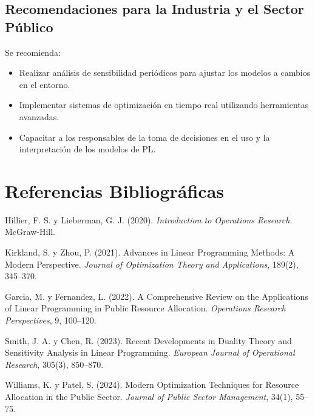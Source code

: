 	\subsection{Recomendaciones para la Industria y el Sector Público}
	Se recomienda:
	\begin{itemize}[noitemsep]
		\item Realizar análisis de sensibilidad periódicos para ajustar los modelos a cambios en el entorno.
		\item Implementar sistemas de optimización en tiempo real utilizando herramientas avanzadas.
		\item Capacitar a los responsables de la toma de decisiones en el uso y la interpretación de los modelos de PL.
	\end{itemize}
\section{Referencias Bibliográficas}

\begin{thebibliography}{10}
	
	Hillier, F. S. y Lieberman, G. J. (2020). \textit{Introduction to Operations Research}. McGraw-Hill.
	
	Kirkland, S. y Zhou, P. (2021). Advances in Linear Programming Methods: A Modern Perspective. \textit{Journal of Optimization Theory and Applications}, 189(2), 345--370.
	
	Garcia, M. y Fernandez, L. (2022). A Comprehensive Review on the Applications of Linear Programming in Public Resource Allocation. \textit{Operations Research Perspectives}, 9, 100--120.
	
	Smith, J. A. y Chen, R. (2023). Recent Developments in Duality Theory and Sensitivity Analysis in Linear Programming. \textit{European Journal of Operational Research}, 305(3), 850--870.
	
	Williams, K. y Patel, S. (2024). Modern Optimization Techniques for Resource Allocation in the Public Sector. \textit{Journal of Public Sector Management}, 34(1), 55--75.
	
\end{thebibliography}
	

